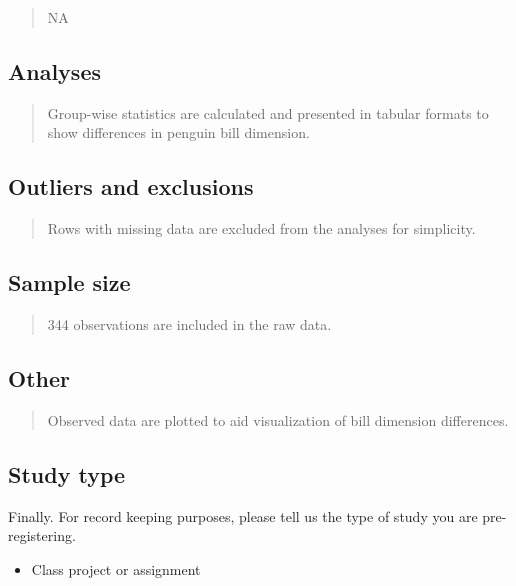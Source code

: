 \documentclass[]{article}
\providecommand{\tightlist}{%
\setlength{\itemsep}{0pt}\setlength{\parskip}{0pt}}
\begin{document}
\begin{quote}
NA
\end{quote}

\hypertarget{analyses}{%
\subsection{Analyses}\label{analyses}}

\begin{quote}
Group-wise statistics are calculated and presented in tabular formats to
show differences in penguin bill dimension.
\end{quote}

\hypertarget{outliers-and-exclusions}{%
\subsection{Outliers and exclusions}\label{outliers-and-exclusions}}

\begin{quote}
Rows with missing data are excluded from the analyses for simplicity.
\end{quote}

\hypertarget{sample-size}{%
\subsection{Sample size}\label{sample-size}}

\begin{quote}
344 observations are included in the raw data.
\end{quote}

\hypertarget{other}{%
\subsection{Other}\label{other}}

\begin{quote}
Observed data are plotted to aid visualization of bill dimension
differences.
\end{quote}

\hypertarget{study-type}{%
\subsection{Study type}\label{study-type}}

Finally. For record keeping purposes, please tell us the type of study
you are pre-registering.

\begin{itemize}
\tightlist
\item
  Class project or assignment
\end{itemize}
\end{document}
